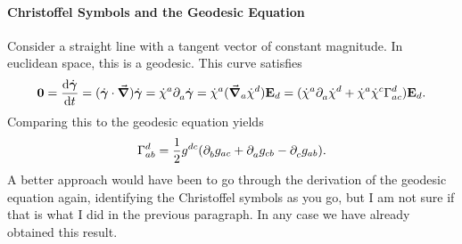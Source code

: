 \paragraph{Christoffel Symbols and the Geodesic Equation}
Consider a straight line with a tangent vector of constant magnitude. In euclidean space, this is a geodesic. This curve satisfies
\begin{align*}
	\vb{0} = \dv{\dot{\vb*{\gamma}}}{t} = (\dot{\vb*{\gamma}}\cdot\grad)\dot{\vb*{\gamma}} = \dot{\chi}^{a}\del{}{a}{\dot{\vb*{\gamma}}} = \dot{\chi}^{a}(\dcov{a}{\dot{\chi}^{d}})\tb{d} = (\dot{\chi}^{a}\del{}{a}{\dot{\chi}^{d}} + \dot{\chi}^{a}\dot{\chi}^{c}\chris{d}{a}{c})\tb{d}.
\end{align*}
Comparing this to the geodesic equation yields
\begin{align*}
	\chris{d}{a}{b} = \frac{1}{2}g^{dc}(\del{}{b}{g_{ac}} + \del{}{a}{g_{cb}} - \del{}{c}{g_{ab}}).
\end{align*}
A better approach would have been to go through the derivation of the geodesic equation again, identifying the Christoffel symbols as you go, but I am not sure if that is what I did in the previous paragraph. In any case we have already obtained this result.